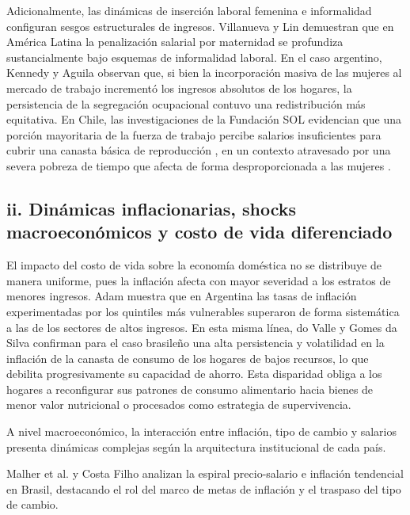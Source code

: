 Adicionalmente, las dinámicas de inserción laboral femenina e informalidad configuran sesgos estructurales de ingresos. Villanueva y Lin \parencite*{VillanuevaLin2020} demuestran que en América Latina la penalización salarial por maternidad se profundiza sustancialmente bajo esquemas de informalidad laboral. En el caso argentino, Kennedy y Aguila \parencite*{KennedyAguila2021} observan que, si bien la incorporación masiva de las mujeres al mercado de trabajo incrementó los ingresos absolutos de los hogares, la persistencia de la segregación ocupacional contuvo una redistribución más equitativa. En Chile, las investigaciones de la Fundación SOL evidencian que una porción mayoritaria de la fuerza de trabajo percibe salarios insuficientes para cubrir una canasta básica de reproducción \parencite{DuranKremerman2024}, en un contexto atravesado por una severa pobreza de tiempo que afecta de forma desproporcionada a las mujeres \parencite{barrigaMujeresPobrezaTiempo2025}.

\subsection{ii. Dinámicas inflacionarias, shocks macroeconómicos y costo de vida diferenciado}

El impacto del costo de vida sobre la economía doméstica no se distribuye de manera uniforme, pues la inflación afecta con mayor severidad a los estratos de menores ingresos. Adam \parencite*{Adam2025} muestra que en Argentina las tasas de inflación experimentadas por los quintiles más vulnerables superaron de forma sistemática a las de los sectores de altos ingresos. En esta misma línea, do Valle y Gomes da Silva \parencite*{doValleGomesdaSilva2026} confirman para el caso brasileño una alta persistencia y volatilidad en la inflación de la canasta de consumo de los hogares de bajos recursos, lo que debilita progresivamente su capacidad de ahorro. Esta disparidad obliga a los hogares a reconfigurar sus patrones de consumo alimentario \parencite{Nessieretal2026, SilvaCanellaetal2026} hacia bienes de menor valor nutricional o procesados como estrategia de supervivencia.

A nivel macroeconómico, la interacción entre inflación, tipo de cambio y salarios presenta dinámicas complejas según la arquitectura institucional de cada país.

Malher et al. \parencite*{Malheretal2026} y Costa Filho \parencite*{CostaFilho2023} analizan la espiral precio-salario e inflación tendencial en Brasil, destacando el rol del marco de metas de inflación y el traspaso del tipo de cambio. 

